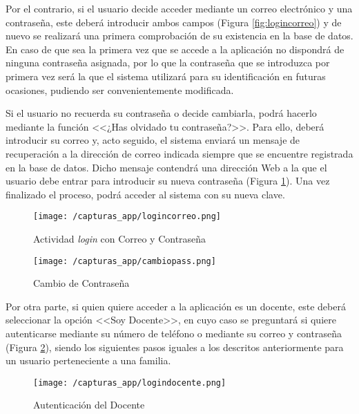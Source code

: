 Por el contrario, si el usuario decide acceder mediante un correo electrónico y una contraseña, este deberá introducir ambos campos (Figura \ref{fig:logincorreo}) y de nuevo se realizará una primera comprobación de su existencia en la base de datos. En caso de que sea la primera vez que se accede a la aplicación no dispondrá de ninguna contraseña asignada, por lo que la contraseña que se introduzca por primera vez será la que el sistema utilizará para su identificación en futuras ocasiones, pudiendo ser convenientemente modificada.

\clearpage

Si el usuario no recuerda su contraseña o decide cambiarla, podrá hacerlo mediante la función <<¿Has olvidado tu contraseña?>>. Para ello, deberá introducir su correo y, acto seguido, el sistema enviará un mensaje de recuperación a la dirección de correo indicada siempre que se encuentre registrada en la base de datos. Dicho mensaje contendrá una dirección Web a la que el usuario debe entrar para introducir su nueva contraseña (Figura \ref{fig:cambiopass}). Una vez finalizado el proceso, podrá acceder al sistema con su nueva clave.

\begin{figure}[!h]
	\centering
	\begin{minipage}{.5\textwidth}
		\centering
		\texttt{[image: /capturas\_app/logincorreo.png]}
		\caption{Actividad \textit{login} con Correo y Contraseña}
		\label{fig:logincorreo}
	\end{minipage}%
	\begin{minipage}{.5\textwidth}
		\centering
		\texttt{[image: /capturas\_app/cambiopass.png]}
		\caption{Cambio de Contraseña}
		\label{fig:cambiopass}
	\end{minipage}
\end{figure}

\clearpage

Por otra parte, si quien quiere acceder a la aplicación es un docente, este deberá seleccionar la opción <<Soy Docente>>, en cuyo caso se preguntará si quiere autenticarse mediante su número de teléfono o mediante su correo y contraseña (Figura \ref{fig:logindocente}), siendo los siguientes pasos iguales a los descritos anteriormente para un usuario perteneciente a una familia.

\begin{figure}[!h]
	\begin{center}
		\texttt{[image: /capturas\_app/logindocente.png]}
		\caption{Autenticación del Docente}
		\label{fig:logindocente}
	\end{center}
\end{figure}

